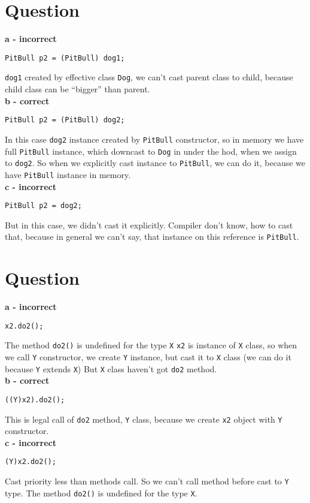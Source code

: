 \documentclass[a4paper,11pt]{article}
\begin{document}
\section{Question}
\textbf{a - incorrect}
\begin{lstlisting}
PitBull p2 = (PitBull) dog1;
\end{lstlisting}
\texttt{dog1} created by effective class \texttt{Dog}, we can't cast parent class to child,
because child class can be ``bigger'' than parent.\\

\textbf{b - correct}
\begin{lstlisting}
PitBull p2 = (PitBull) dog2;
\end{lstlisting}
In this case \texttt{dog2} instance created by \texttt{PitBull} constructor, so in memory we have
full \texttt{PitBull} instance, which downcast to \texttt{Dog} in under the hod, when we assign to \texttt{dog2}.
So when we explicitly cast instance to \texttt{PitBull}, we can do it, because we have \texttt{PitBull} instance in memory.\\

\textbf{c - incorrect}
\begin{lstlisting}
PitBull p2 = dog2;
\end{lstlisting}
But in this case, we didn't cast it explicitly. Compiler don't know, how to cast that, because in general
we can't say, that instance on this reference is \texttt{PitBull}.\\

\section{Question}

\textbf{a - incorrect}
\begin{lstlisting}
x2.do2();
\end{lstlisting}
The method \texttt{do2()} is undefined for the type \texttt{X}
\texttt{x2} is instance of \texttt{X} class, so when we call \texttt{Y} constructor,
we create \texttt{Y} instance, but cast it to \texttt{X} class (we can do it because \texttt{Y} extends \texttt{X})
But \texttt{X} class haven't got \texttt{do2} method.\\

\textbf{b - correct}
\begin{lstlisting}
((Y)x2).do2();
\end{lstlisting}
This is legal call of \texttt{do2} method, \texttt{Y} class, because we create \texttt{x2} object with \texttt{Y} constructor.\\

\textbf{c - incorrect}
\begin{lstlisting}
(Y)x2.do2();
\end{lstlisting}
Cast priority less than methods call.
So we can't call method before cast to \texttt{Y} type.
The method \texttt{do2()} is undefined for the type \texttt{X}.
\end{document}
